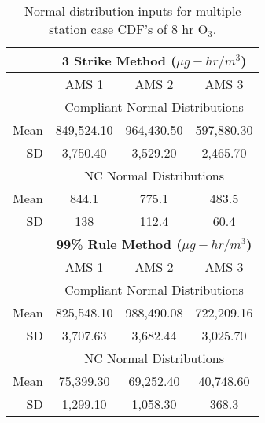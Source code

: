 % 
\begin{table}[!htb]
\centering
\caption{Parameters for multiple station case of 8 hr O$_{3}$}
\label{tb14:multiParamO3}
\end{table}
%
\begin{table}[!htb]
\centering
\caption{Normal distribution inputs for multiple station case CDF’s of 8 hr O$_{3}$.}
\label{tb15:normalinputs03}
\begin{tabular}{@{}rccc@{}}
\toprule
 & \multicolumn{3}{c}{\textbf{3 Strike Method ($\mu g-hr/m^{3}$)}} \\ \midrule
 & AMS 1 & AMS 2 & AMS 3 \\
 & \multicolumn{3}{c}{Compliant Normal Distributions} \\
Mean & 849,524.10 & 964,430.50 & 597,880.30 \\
SD & 3,750.40 & 3,529.20 & 2,465.70 \\
 & \multicolumn{3}{c}{NC Normal Distributions} \\
Mean & 844.1 & 775.1 & 483.5 \\
SD & 138 & 112.4 & 60.4 \\
 & \multicolumn{3}{c}{\textbf{99\% Rule Method ($\mu g-hr/m^{3}$)}} \\
 & AMS 1 & AMS 2 & AMS 3 \\
 & \multicolumn{3}{c}{Compliant Normal Distributions} \\
Mean & 825,548.10 & 988,490.08 & 722,209.16 \\
SD & 3,707.63 & 3,682.44 & 3,025.70 \\
 & \multicolumn{3}{c}{NC Normal Distributions} \\
Mean & 75,399.30 & 69,252.40 & 40,748.60 \\
SD & 1,299.10 & 1,058.30 & 368.3 \\ \bottomrule
\end{tabular}
\end{table}

